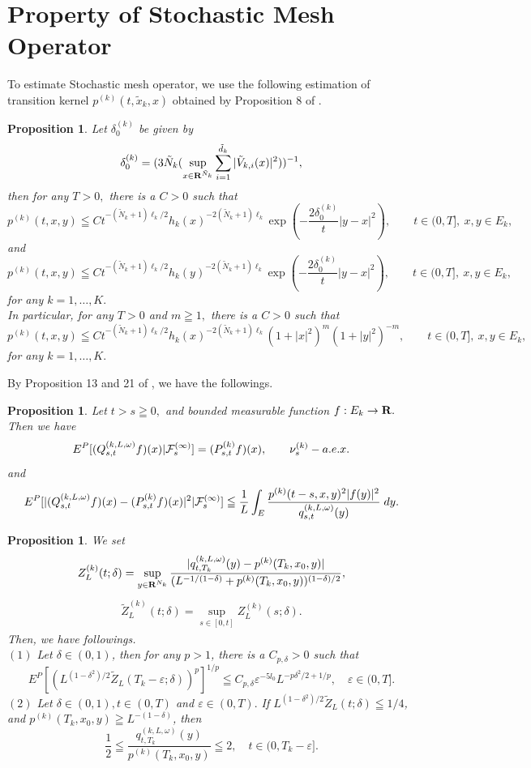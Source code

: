 \documentclass[12pt]{article}
\newtheorem{prop}[thm]{Proposition}%
\newtheorem{proposition}[thm]{Proposition}
\begin{document}
\section{Property of Stochastic Mesh Operator}
To estimate Stochastic mesh operator, we use the following estimation of 
transition kernel $p^{(k)}(t,\tilde{x}_k, x)$ obtained by Proposition 8 of  \cite{KM}.
\begin{proposition}\label{heatKernel}
Let $\delta_0^{(k)}$ be given by 
$$\delta_0^{(k)}=(3\tilde{N}_k(\sup_{x\in {\bf R}^{\tilde{N}_k}} \sum_{i=1}^{\tilde{d}_k}|\tilde{V}_{k,i}(x)|^2))^{-1},$$
then for any $T>0,$ there is a $C>0$ such that
$$
p^{(k)}(t,x,y)
\leqq C t^{- (\tilde{N}_k+1) \ell_k /2} h_k(x)^{-2(\tilde{N}_k+1)\ell_k}\exp (- \frac{2\delta_0^{(k)}}{t}|y-x|^2 ), 
\qquad  t \in (0,T], \ x,y \in E_k,
$$
and
$$
p^{(k)}(t,x,y)
\leqq C t^{- (\tilde{N}_k+1) \ell_k /2} h_k(y)^{-2(\tilde{N}_k+1)\ell_k}\exp (- \frac{2\delta_0^{(k)}}{t}|y-x|^2 ), 
\qquad  t \in (0,T], \ x,y \in E_k,
$$
for any $k=1,\ldots,K.$\\
In particular, for any $T>0$ and $m\geqq 1,$ 
there is a $C>0$ such that
$$
p^{(k)}(t,x,y)
\leqq C t^{- (\tilde{N}_k+1) \ell_k /2} h_k(x)^{-2(\tilde{N}_k+1)\ell_k}(1+|x|^2)^m
(1+|y|^2)^{-m}, 
\qquad  t \in (0,T], \ x,y \in E_k,
$$
for any $k=1,\ldots,K.$
\end{proposition}

By Proposition 13 and 21 of \cite{KM}, we have the followings.
\begin{proposition}\label{basic}
Let $t>s\geqq 0,$ 
and bounded measurable function $f:E_k\to {\bf R}.$
Then we have 
$$
E^P[(Q_{s,t}^{(k,L,\omega)}f)(x)| {\cal F}_{s}^{(\infty )}] 
= (P^{(k)}_{s,t}f)(x),
\qquad \nu_s^{(k)}-a.e.x.
$$
and 
$$
E^P[ |(Q_{s,t}^{(k,L,\omega)}f)(x) - (P^{(k)}_{s,t}f)(x)|^2 | {\cal F}_s^{(\infty )}]
\leqq 
\frac{1}{L}
\int_{E} \frac{p^{(k)}(t-s,x,y)^2 |f(y)|^2}{q_{s,t}^{(k,L,\omega)}(y)}\; dy .
$$
\end{proposition}

\begin{prop}\label{exSet}
We set
\begin{align*}
Z_L^{(k)}(t;\delta)=\sup_{y\in {\bf R}^{N_k}} \frac{|q_{t,T_k}^{(k,L,\omega)}(y)- p^{(k)}(T_k, x_0, y)|}
{(L^{-1/(1-\delta)}+p^{(k)}(T_k, x_0,y))^{(1-\delta)/2}},
\end{align*}
\begin{align*}
\tilde{Z}_L^{(k)}(t; \delta)=\sup_{s\in [0,t]} Z_L^{(k)}(s;\delta).
\end{align*}
Then, we have followings.\\
$(1)$ Let $\delta \in (0,1)$, then for any $p > 1$, there is a $C_{p,\delta} > 0$ such that
$$
E^P[(L^{(1-\delta^2)/2}\tilde{Z}_L(T_k-\varepsilon; \delta))^p]^{1/p}\leqq C_{p,\delta}\varepsilon^{-5l_0}L^{-p\delta^2/2+1/p},
\quad \varepsilon \in  (0,T].$$
$(2)$ Let $\delta \in (0,1), t \in (0, T)$ and $\varepsilon \in (0,T).$  If $L^{(1-\delta^2)/2}\tilde{Z}_L(t; \delta) \leqq 1/4$, and  $p^{(k)}(T_k, x_0, y) \geqq L^{-(1-\delta)}$, then
$$
\frac{1}{2} \leqq \frac{q_{t,T_k}^{(k,L,\omega)}(y)}{p^{(k)}(T_k, x_0, y)} \leqq 2,  \quad t \in (0, T_k-\varepsilon].
$$
\end{prop}
\end{document}

